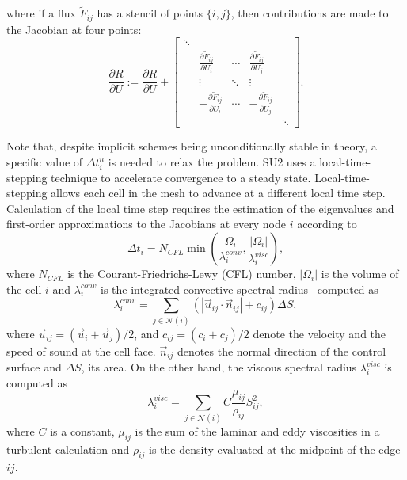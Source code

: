 where if a flux $\tilde F_{ij}$ has a stencil of points $\{i, j\}$, then contributions are made to the Jacobian at four points:
\begin{equation}
\frac{\partial R}{\partial U} := \frac{\partial R}{\partial U} + \left[
\begin{array}{ccccc}
\ddots & & & & \\
 & \frac{\partial \tilde{F}_{ij}}{\partial U_i} & \cdots & \frac{\partial \tilde{F}_{ij}}{\partial U_j} & \\
 & \vdots & \ddots & \vdots & \\
 & -\frac{\partial \tilde{F}_{ij}}{\partial U_i} & \cdots & -\frac{\partial \tilde{F}_{ij}}{\partial U_j} & \\
 & & & & \ddots 
\end{array}
\right].
\end{equation}

Note that, despite implicit schemes being unconditionally stable in theory, a specific value of $\Delta t_i^n$ is needed to relax the problem. SU2 uses a local-time-stepping technique to accelerate convergence to a steady state. Local-time-stepping allows each cell in the mesh to advance at a different local time step. Calculation of the local time step requires the estimation of the eigenvalues and first-order approximations to the Jacobians at every node $i$ according to
\begin{equation}
\Delta t_i=N_{CFL} \min{\left(\frac{|\Omega_i|}{\lambda^{conv}_i},\frac{|\Omega_i|}{\lambda^{visc}_{i}}\right)},
\end{equation}
where $N_{CFL}$ is the Courant-Friedrichs-Lewy (CFL) number, $|\Omega_i|$ is the volume of the cell $i$ and $\lambda^{conv}_i$ is the integrated convective spectral radius~\cite{eliasson2002} computed as 
\begin{equation}
\lambda^{conv}_i=\sum_{j \in \mathcal{N}(i)}(|\vec u_{ij}\cdot\vec n_{ij}|+c_{ij})\Delta S,
\end{equation}
where $\vec u_{ij} = (\vec u_i + \vec u_j)/2$, and $c_{ij} = (c_i + c_j)/2$ denote the velocity and the speed of sound at the cell face. $\vec n_{ij}$ denotes the normal direction of the control surface and $\Delta S$, its area. On the other hand, the viscous spectral radius $\lambda^{visc}_{i}$ is computed as
\begin{equation}
\lambda^{visc}_{i} = \sum_{j \in \mathcal{N}(i)}C \frac{\mu_{ij}}{\rho_{ij}} S_{ij}^2,
\end{equation}
where $C$ is a constant, $\mu_{ij}$ is the sum of the laminar and eddy viscosities in a turbulent calculation and $\rho_{ij}$ is the density evaluated at the midpoint of the edge $ij$.

